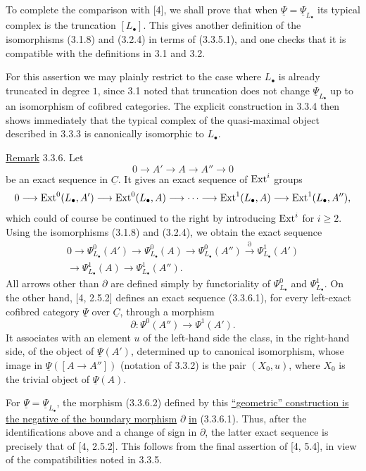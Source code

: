 To complete the comparison with [4], we shall prove that when
$\underline\Psi=\underline\Psi_{L_\bullet}$ its typical complex is
the truncation $[L_\bullet]$. This gives another definition of the
isomorphisms (3.1.8) and (3.2.4) in terms of (3.3.5.1), and one
checks that it is compatible with the definitions in 3.1 and 3.2.

For this assertion we may plainly restrict to the case where
$L_\bullet$ is already truncated in degree $1$, since 3.1 noted that
truncation does not change $\underline\Psi_{L_\bullet}$ up to an
isomorphism of cofibred categories. The explicit construction in
3.3.4 then shows immediately that the typical complex of the
quasi-maximal object described in 3.3.3 is canonically isomorphic to
$L_\bullet$.

\underline{Remark} 3.3.6. Let
\[
 0\longrightarrow A'\longrightarrow A\longrightarrow A''
 \longrightarrow0
\]
be an exact sequence in $\underline C$. It gives an exact sequence
of $\operatorname{Ext}^i$ groups
\[
 0\longrightarrow\operatorname{Ext}^0(L_\bullet,A')
 \longrightarrow\operatorname{Ext}^0(L_\bullet,A)
 \longrightarrow\cdots\longrightarrow\operatorname{Ext}^1(L_\bullet,A)
 \longrightarrow\operatorname{Ext}^1(L_\bullet,A''),
\]
which could of course be continued to the right by introducing
$\operatorname{Ext}^i$ for $i\geq2$. Using the isomorphisms (3.1.8) and (3.2.4),
we obtain the exact sequence
\begin{multline}\tag{3.3.6.1}
 0\longrightarrow\Psi^0_{L_\bullet}(A')
 \longrightarrow\Psi^0_{L_\bullet}(A)
 \longrightarrow\Psi^0_{L_\bullet}(A'')
 \xrightarrow{\partial}\Psi^1_{L_\bullet}(A')\\
 \longrightarrow\Psi^1_{L_\bullet}(A)
 \longrightarrow\Psi^1_{L_\bullet}(A'').
\end{multline}
All arrows other than $\partial$ are defined simply by functoriality
of $\Psi^0_{L_\bullet}$ and $\Psi^1_{L_\bullet}$. On the other hand,
[4, 2.5.2] defines an exact sequence (3.3.6.1), for every left-exact
cofibred category $\underline\Psi$ over $\underline C$, through a
morphism
\begin{equation}\tag{3.3.6.2}
 \partial:\Psi^0(A'')\longrightarrow\Psi^1(A').
\end{equation}
It associates with an element $u$ of the left-hand side the class,
in the right-hand side, of the object of $\underline\Psi(A')$,
determined up to canonical isomorphism, whose image in
$\underline\Psi([A\longrightarrow A''])$ (notation of 3.3.2) is the
pair $(X_0,u)$, where $X_0$ is the trivial object of
$\underline\Psi(A)$.

For $\underline\Psi=\underline\Psi_{L_\bullet}$, the morphism
(3.3.6.2) defined by this \underline{``geometric'' construction is
the negative of the boundary morphism} $\partial$ \underline{in}
(3.3.6.1). Thus, after the identifications above and a change of
sign in $\partial$, the latter exact sequence is precisely that of
[4, 2.5.2]. This follows from the final assertion of [4, 5.4], in
view of the compatibilities noted in 3.3.5.

